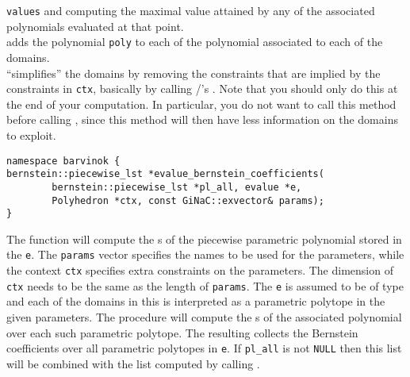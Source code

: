 \verb+values+ and computing the maximal value attained by any of the
associated polynomials evaluated at that point.
\\
 adds the polynomial \verb+poly+
to each of the polynomial associated to each of the domains.
\\
 ``simplifies'' the domains
by removing the constraints that are implied by the constraints
in \verb+ctx+, basically by calling \PolyLib/'s
.  Note that you should only do this
at the end of your computation.  In particular, you do not
want to call this method before calling
, since this method will then
have less information on the domains to exploit.


\begin{verbatim}
namespace barvinok {
bernstein::piecewise_lst *evalue_bernstein_coefficients(
	    bernstein::piecewise_lst *pl_all, evalue *e, 
	    Polyhedron *ctx, const GiNaC::exvector& params);
}
\end{verbatim}
The  function will compute the
s of the piecewise parametric polynomial stored in the
 \verb+e+.
The \verb+params+ vector specifies the names to be used for the parameters,
while the context  \verb+ctx+ specifies extra constraints
on the parameters.
The dimension of \verb+ctx+ needs to be the same as the length of \verb+params+.
The  \verb+e+ is assumed to be of type 
and each of the domains in this  is interpreted
as a parametric polytope in the given parameters. The procedure
will compute the s of the associated polynomial
over each such parametric polytope.
The resulting  collects the 
Bernstein coefficients over all parametric polytopes in \verb+e+.
If \verb+pl_all+ is not \verb+NULL+ then this list will be combined
with the list computed by calling .
